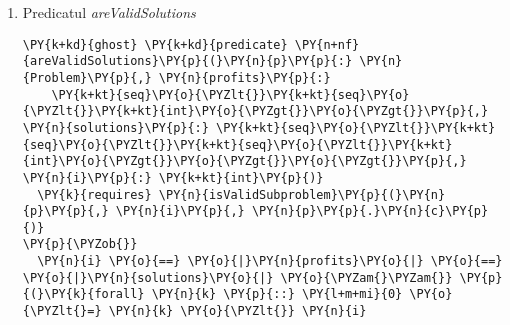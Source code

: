 \begin{enumerate}
\begin{Verbatim}[commandchars=\\\{\}]
    \PY{n}{partialProfits}\PY{p}{:} \PY{k+kt}{seq}\PY{o}{\PYZlt{}}\PY{k+kt}{int}\PY{o}{\PYZgt{}}\PY{p}{,} \PY{n}{partialSolutions}\PY{p}{:} \PY{k+kt}{seq}\PY{o}{\PYZlt{}}\PY{k+kt}{seq}\PY{o}{\PYZlt{}}\PY{k+kt}{int}\PY{o}{\PYZgt{}}\PY{o}{\PYZgt{}}\PY{p}{,} 
    \PY{n}{i}\PY{p}{:} \PY{k+kt}{int}\PY{p}{,} \PY{n}{j}\PY{p}{:} \PY{k+kt}{int}\PY{p}{)}    
  \PY{k}{requires} \PY{n}{isValidSubproblem}\PY{p}{(}\PY{n}{p}\PY{p}{,} \PY{n}{i}\PY{p}{,} \PY{n}{j}\PY{p}{)}
\PY{p}{\PYZob{}}
  \PY{o}{|}\PY{n}{partialSolutions}\PY{o}{|} \PY{o}{==} \PY{o}{|}\PY{n}{partialProfits}\PY{o}{|} \PY{o}{==} \PY{n}{j} \PY{o}{\PYZam{}\PYZam{}} 
  \PY{p}{(}\PY{k}{forall} \PY{n}{k} \PY{p}{::} \PY{l+m+mi}{0} \PY{o}{\PYZlt{}=} \PY{n}{k} \PY{o}{\PYZlt{}} \PY{o}{|}\PY{n}{partialSolutions}\PY{o}{|} \PY{o}{==}\PY{o}{\PYZgt{}} 
    \PY{n}{isOptimalPartialSolution}\PY{p}{(}\PY{n}{p}\PY{p}{,} \PY{n}{partialSolutions}\PY{p}{[}\PY{n}{k}\PY{p}{]}\PY{p}{,} \PY{n}{i}\PY{p}{,} \PY{n}{k}\PY{p}{)}\PY{p}{)} \PY{o}{\PYZam{}\PYZam{}} 
  \PY{p}{(}\PY{k}{forall} \PY{n}{k} \PY{p}{::} \PY{l+m+mi}{0} \PY{o}{\PYZlt{}=} \PY{n}{k} \PY{o}{\PYZlt{}} \PY{o}{|}\PY{n}{partialSolutions}\PY{o}{|} \PY{o}{==}\PY{o}{\PYZgt{}} 
    \PY{n}{gain}\PY{p}{(}\PY{n}{p}\PY{p}{,} \PY{n}{partialSolutions}\PY{p}{[}\PY{n}{k}\PY{p}{]}\PY{p}{)} \PY{o}{==} \PY{n}{partialProfits}\PY{p}{[}\PY{n}{k}\PY{p}{]}\PY{p}{)}
\PY{p}{\PYZcb{}}
\end{Verbatim}
    este folosit pentru a valida rezultatele obținute doar pentru subproblemele pasului curent, în funcție de modificările aduse datorate creșterii numărului de obiecte disponibile.
    \item Predicatul \textit{areValidSolutions}
    \begin{Verbatim}[commandchars=\\\{\}]
\PY{k+kd}{ghost} \PY{k+kd}{predicate} \PY{n+nf}{areValidSolutions}\PY{p}{(}\PY{n}{p}\PY{p}{:} \PY{n}{Problem}\PY{p}{,} \PY{n}{profits}\PY{p}{:} 
    \PY{k+kt}{seq}\PY{o}{\PYZlt{}}\PY{k+kt}{seq}\PY{o}{\PYZlt{}}\PY{k+kt}{int}\PY{o}{\PYZgt{}}\PY{o}{\PYZgt{}}\PY{p}{,} \PY{n}{solutions}\PY{p}{:} \PY{k+kt}{seq}\PY{o}{\PYZlt{}}\PY{k+kt}{seq}\PY{o}{\PYZlt{}}\PY{k+kt}{seq}\PY{o}{\PYZlt{}}\PY{k+kt}{int}\PY{o}{\PYZgt{}}\PY{o}{\PYZgt{}}\PY{o}{\PYZgt{}}\PY{p}{,} \PY{n}{i}\PY{p}{:} \PY{k+kt}{int}\PY{p}{)}
  \PY{k}{requires} \PY{n}{isValidSubproblem}\PY{p}{(}\PY{n}{p}\PY{p}{,} \PY{n}{i}\PY{p}{,} \PY{n}{p}\PY{p}{.}\PY{n}{c}\PY{p}{)}
\PY{p}{\PYZob{}} 
  \PY{n}{i} \PY{o}{==} \PY{o}{|}\PY{n}{profits}\PY{o}{|} \PY{o}{==} \PY{o}{|}\PY{n}{solutions}\PY{o}{|} \PY{o}{\PYZam{}\PYZam{}} \PY{p}{(}\PY{k}{forall} \PY{n}{k} \PY{p}{::} \PY{l+m+mi}{0} \PY{o}{\PYZlt{}=} \PY{n}{k} \PY{o}{\PYZlt{}} \PY{n}{i} 

\end{Verbatim}
\end{enumerate}
